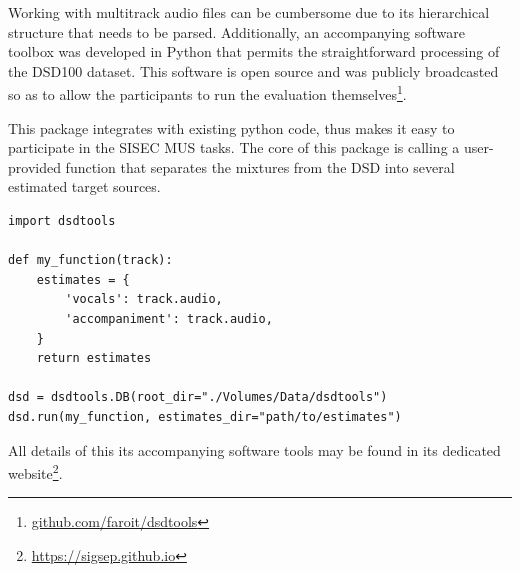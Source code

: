 Working with multitrack audio files can be cumbersome due to its hierarchical structure that needs to be parsed.
Additionally, an accompanying software toolbox was developed in Python that permits the straightforward processing of the DSD100 dataset. This software  is open source and was publicly broadcasted so as to allow the participants to run the evaluation themselves\footnote{\url{github.com/faroit/dsdtools}}.

This package integrates with existing python code, thus makes it easy to participate in the SISEC MUS tasks. The core of this package is calling a user-provided function that separates the mixtures from the DSD into several estimated target sources.

\begin{code}
\begin{verbatim}
import dsdtools

def my_function(track):
    estimates = {
        'vocals': track.audio,
        'accompaniment': track.audio,
    }
    return estimates

dsd = dsdtools.DB(root_dir="./Volumes/Data/dsdtools")
dsd.run(my_function, estimates_dir="path/to/estimates")
\end{verbatim}
\label{code:c-code}
\end{code}

All details of this its accompanying software tools may be found in its dedicated website\footnote{\url{https://sigsep.github.io}}.